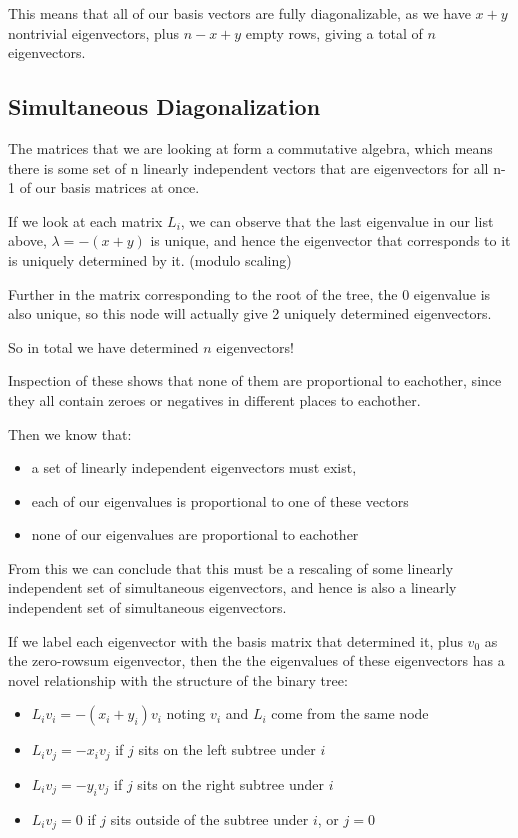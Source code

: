 \documentclass{report}
\begin{document}
This means that all of our basis vectors are fully diagonalizable, as we have
$x+y$ nontrivial eigenvectors, plus $n-x+y$ empty rows, giving a total of $n$
eigenvectors.

\subsection{Simultaneous Diagonalization}

The matrices that we are looking at form a commutative algebra, which means
there is some set of n linearly independent vectors that are eigenvectors for
all n-1 of our basis matrices at once.

If we look at each matrix $L_i$, we can observe that the last eigenvalue in our
list above, $\lambda = -(x + y)$ is unique, and hence the eigenvector that
corresponds to it is uniquely determined by it. (modulo scaling)

Further in the matrix corresponding to the root of the tree, the $0$ eigenvalue
is also unique, so this node will actually give 2 uniquely determined
eigenvectors.

So in total we have determined $n$ eigenvectors!

Inspection of these shows that none of them are proportional to eachother,
since they all contain zeroes or negatives in different places to eachother.

Then we know that:
\begin{itemize}
	\item a set of linearly independent eigenvectors must exist,
	\item each of our eigenvalues is proportional to one of these vectors
	\item none of our eigenvalues are proportional to eachother
\end{itemize}
From this we can conclude that this must be a rescaling of some linearly
independent set of simultaneous eigenvectors, and hence is also a linearly
independent set of simultaneous eigenvectors.

If we label each eigenvector with the basis matrix that determined it, plus
$v_0$ as the zero-rowsum eigenvector, then the the eigenvalues of these
eigenvectors has a novel relationship with the structure of the binary tree:
\begin{itemize}
	\item $L_iv_i = -(x_i + y_i)v_i$ noting $v_i$ and $L_i$ come from the same
		node
	\item $L_iv_j = -x_iv_j$ if $j$ sits on the left subtree under $i$
	\item $L_iv_j = -y_iv_j$ if $j$ sits on the right subtree under $i$
	\item $L_iv_j = 0$ if $j$ sits outside of the subtree under $i$, or $j=0$
\end{itemize}
\end{document}
